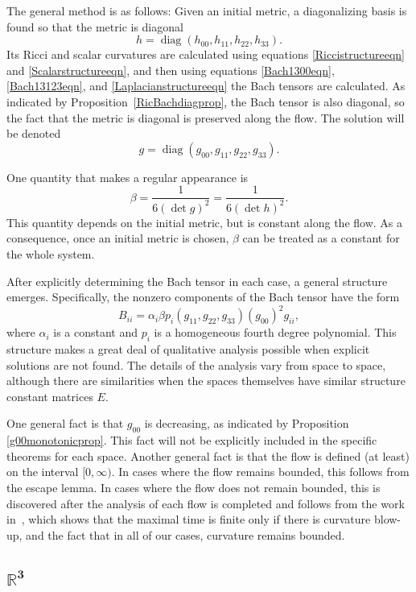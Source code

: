 \documentclass[10pt,a4paper]{amsart}
\numberwithin{equation}{section}
\newcommand{\diag}{\operatorname{diag}} %
\begin{document}
The general method is as follows: Given an initial metric, a diagonalizing basis is found so that the metric is diagonal
\[
h = \diag(h_{00}, h_{11}, h_{22}, h_{33}).
\]
Its Ricci and scalar curvatures are calculated using equations \eqref{Riccistructureeqn} and \eqref{Scalarstructureeqn}, and then using equations \eqref{Bach1300eqn}, \eqref{Bach13123eqn}, and \eqref{Laplacianstructureeqn} the Bach tensors are calculated. As indicated by Proposition~\ref{RicBachdiagprop}, the Bach tensor is also diagonal, so the fact that the metric is diagonal is preserved along the flow. The solution will be denoted
\[
g = \diag(g_{00}, g_{11}, g_{22}, g_{33}).
\]

One quantity that makes a regular appearance is
\[
\beta = \frac{1}{6 (\det g)^2} = \frac{1}{6 (\det h)^2}.
\]
This quantity depends on the initial metric, but is constant along the flow. As a consequence, once an initial metric is chosen, $\beta$ can be treated as a constant for the whole system.

After explicitly determining the Bach tensor in each case, a general structure emerges. Speci\-fi\-cally, the nonzero components of the Bach tensor have the form
\[
B_{ii} = \alpha_i \beta p_{i}(g_{11}, g_{22}, g_{33}) (g_{00})^2 g_{ii},
\]
where $\alpha_i$ is a constant and $p_{i}$ is a homogeneous fourth degree polynomial.
This structure makes a great deal of qualitative analysis possible when explicit solutions are not found. The details of the analysis vary from space to space, although there are similarities when the spaces themselves have similar structure constant matrices $E$.

%
%
One general fact is that $g_{00}$ is decreasing, as indicated by Proposition \ref{g00monotonicprop}. This fact will not be explicitly included in the specific theorems for each space. Another general fact is that the flow is defined (at least) on the interval $[0, \infty)$. In cases where the flow remains bounded, this follows from the escape lemma. In cases where the flow does not remain bounded, this is discovered after the analysis of each flow is completed and follows from the work in~\cite{Lopez}, which shows that the maximal time is finite only if there is curvature blow-up, and the fact that in all of our cases, curvature remains bounded.

\subsection[$\mathbb{R}^3$]{$\boldsymbol{\mathbb{R}^3}$} \label{r3subsection}
\end{document}
